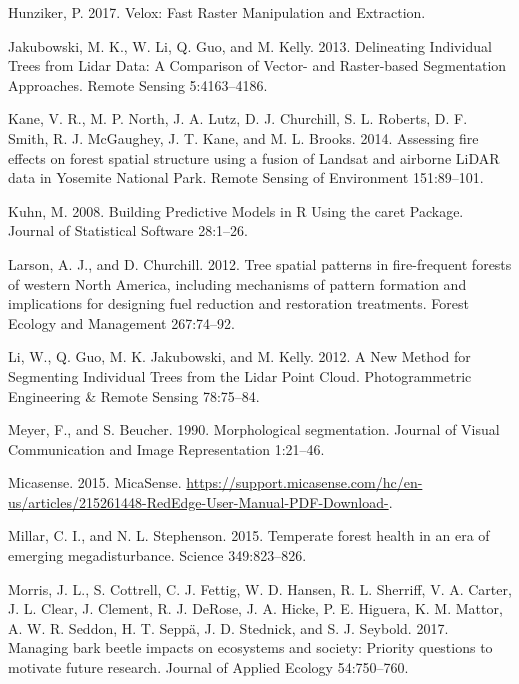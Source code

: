 \documentclass[]{article}
\begin{document}
\hypertarget{ref-hunziker2017}{}
Hunziker, P. 2017. Velox: Fast Raster Manipulation and Extraction.

\hypertarget{ref-jakubowski2013}{}
Jakubowski, M. K., W. Li, Q. Guo, and M. Kelly. 2013. Delineating
Individual Trees from Lidar Data: A Comparison of Vector- and
Raster-based Segmentation Approaches. Remote Sensing 5:4163--4186.

\hypertarget{ref-kane2014}{}
Kane, V. R., M. P. North, J. A. Lutz, D. J. Churchill, S. L. Roberts, D.
F. Smith, R. J. McGaughey, J. T. Kane, and M. L. Brooks. 2014. Assessing
fire effects on forest spatial structure using a fusion of Landsat and
airborne LiDAR data in Yosemite National Park. Remote Sensing of
Environment 151:89--101.

\hypertarget{ref-kuhn2008}{}
Kuhn, M. 2008. Building Predictive Models in R Using the caret Package.
Journal of Statistical Software 28:1--26.

\hypertarget{ref-larson2012}{}
Larson, A. J., and D. Churchill. 2012. Tree spatial patterns in
fire-frequent forests of western North America, including mechanisms of
pattern formation and implications for designing fuel reduction and
restoration treatments. Forest Ecology and Management 267:74--92.

\hypertarget{ref-li2012}{}
Li, W., Q. Guo, M. K. Jakubowski, and M. Kelly. 2012. A New Method for
Segmenting Individual Trees from the Lidar Point Cloud. Photogrammetric
Engineering \& Remote Sensing 78:75--84.

\hypertarget{ref-meyer1990}{}
Meyer, F., and S. Beucher. 1990. Morphological segmentation. Journal of
Visual Communication and Image Representation 1:21--46.

\hypertarget{ref-micasense2015}{}
Micasense. 2015. MicaSense.
\url{https://support.micasense.com/hc/en-us/articles/215261448-RedEdge-User-Manual-PDF-Download-}.

\hypertarget{ref-millar2015}{}
Millar, C. I., and N. L. Stephenson. 2015. Temperate forest health in an
era of emerging megadisturbance. Science 349:823--826.

\hypertarget{ref-morris2017}{}
Morris, J. L., S. Cottrell, C. J. Fettig, W. D. Hansen, R. L. Sherriff,
V. A. Carter, J. L. Clear, J. Clement, R. J. DeRose, J. A. Hicke, P. E.
Higuera, K. M. Mattor, A. W. R. Seddon, H. T. Seppä, J. D. Stednick, and
S. J. Seybold. 2017. Managing bark beetle impacts on ecosystems and
society: Priority questions to motivate future research. Journal of
Applied Ecology 54:750--760.
\end{document}
